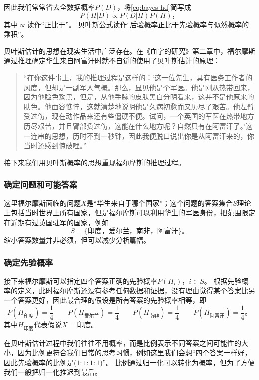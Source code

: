 因此我们常常省去全数据概率$P(D)$，将\cref{eq:bayes-hd}简写成
\begin{equation}\label{eq:bayes-propto}
    P(H|D)\propto P(D|H)P(H)，
\end{equation}
其中$\propto$读作“正比于”。
贝叶斯公式读作“后验概率正比于先验概率与似然概率的乘积”。

贝叶斯估计的思想在现实生活中广泛存在。在《血字的研究》第二章中，福尔摩斯通过推理确定华生来自阿富汗时就不自觉的使用了贝叶斯估计的原理：
\begin{quotation}
    “在你这件事上，我的推理过程是这样的：‘这一位先生，具有医务工作者的风度，但却是一副军人气概。那么，显见他是个军医。他是刚从热带回来，因为他脸色黝黑，但是，从他手腕的皮肤黑白分明看来，这并不是他原来的肤色。他面容憔悴，这就清楚地说明他是久病初愈而又历尽了艰苦。他左臂受过伤，现在动作品来还有些僵硬不便。试问，一个英国的军医在热带地方历尽艰苦，并且臂部负过伤，这能在什么地方呢？自然只有在阿富汗了。’这一连串的思想，历时不到一秒钟，因此我便脱口说出你是从阿富汗来的，你当时还感到惊破哩。”
\end{quotation}
接下来我们用贝叶斯概率的思想重现福尔摩斯的推理过程。

\subsubsection{确定问题和可能答案}

这里福尔摩斯面临的问题$X$是“华生来自于哪个国家”；这个问题的答案集合$S$理论上包括当时世界上所有国家，但是福尔摩斯可以利用华生的军医身份，把范围限定在近期有过英国驻军的国家，例如
\begin{equation*}
S=\{印度，爱尔兰，南非，阿富汗\}。
\end{equation*}
缩小答案数量并非必须，但可以减少分析篇幅。

\subsubsection{确定先验概率}

接下来福尔摩斯可以指定四个答案正确的先验概率$P(H_i)，i\in S$。
根据先验概率的定义，此时福尔摩斯还没有参考任何数据和证据，没有理由觉得某个答案比另一个答案更好，因此最合理的假设是所有答案的先验概率相等，即
\begin{equation*}
    P(H_{印度})=\frac{1}{4}\qquad P(H_{爱尔兰})=\frac{1}{4}\qquad P(H_{南非})=\frac{1}{4}\qquad P(H_{阿富汗})=\frac{1}{4}。
\end{equation*}
其中$H_{印度}$代表假说$X=印度$。

在贝叶斯估计过程中我们往往不用概率，而是比例表示不同答案之间可能性的大小，因为比例更符合我们日常的思考习惯，例如这里我们会想“四个答案一样好，因此先验概率的比例是$(1:1:1:1$)”。
比例通过归一化可以转化为概率，但为了方便我们一般把归一化推迟到最后。

